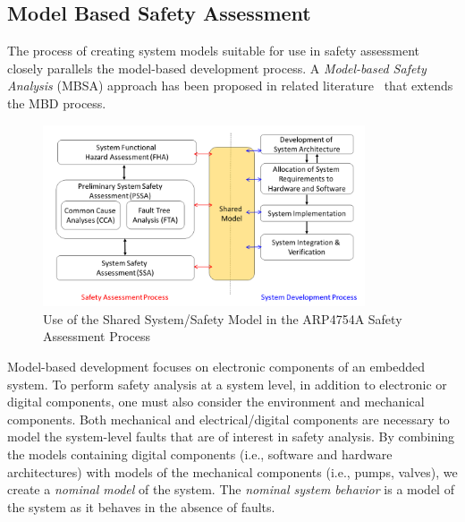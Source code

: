 \subsection{Model Based Safety Assessment}
\label{subsec:mbsa}
The process of creating system models suitable for use in safety assessment closely parallels the model-based development process. A \emph{Model-based Safety Analysis} (MBSA) approach has been proposed in related literature~\cite{Joshi05:Dasc, joshi2008behavioral, criticalembeddedsystems} that extends the MBD process. 

\begin{figure}[h]
	\centering
	\includegraphics[trim=0 5 0 5,clip,width=0.85\textwidth]{images/process3.png}
	\caption{Use of the Shared System/Safety Model in the ARP4754A Safety Assessment Process}
	\label{fig:proposed_safety_process}
\end{figure}

Model-based development focuses on electronic components of an embedded system. To perform safety analysis at a system level, in addition to electronic or digital components, one must also consider the environment and mechanical components. Both mechanical and electrical/digital components are necessary to model the system-level faults that are of interest in safety analysis. By combining the models containing digital components (i.e., software and hardware architectures) with models of the mechanical components (i.e., pumps, valves), we create a \emph{nominal model} of the system. The \emph{nominal system behavior} is a model of the system as it behaves in the absence of faults. 

